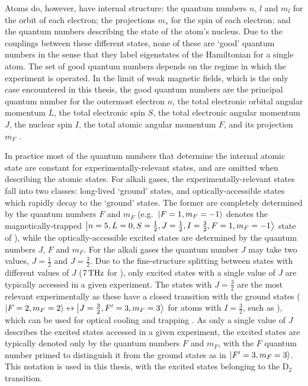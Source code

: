 Atoms do, however, have internal structure: the quantum numbers $n$, $l$ and $m_l$ for the orbit of each electron; the projections $m_s$ for the spin of each electron; and the quantum numbers describing the state of the atom's nucleus.  Due to the couplings between these different states, none of these are `good' quantum numbers in the sense that they label eigenstates of the Hamiltonian for a single atom.  The set of good quantum numbers depends on the regime in which the experiment is operated.  In the limit of weak magnetic fields, which is the only case encountered in this thesis, the good quantum numbers are the principal quantum number for the outermost electron $n$, the total electronic orbital angular momentum $L$, the total electronic spin $S$, the total electronic angular momentum $J$, the nuclear spin $I$, the total atomic angular momentum $F$, and its projection $m_F$ \citep{Bergmann:1997}.  

In practice most of the quantum numbers that determine the internal atomic state are constant for experimentally-relevant states, and are omitted when describing the atomic states.  For alkali gases, the experimentally-relevant states fall into two classes: long-lived `ground' states, and optically-accessible states which rapidly decay to the `ground' states.  The former are completely determined by the quantum numbers $F$ and $m_F$ (e.g.\ ${\left|F=1, m_F=-1\right>}$ denotes the magnetically-trapped ${\left|n=5, L=0, S=\frac{1}{2}, J = \frac{1}{2}, I=\frac{3}{2}, F=1, m_F=-1\right>}$ state of ), while the optically-accessible excited states are determined by the quantum numbers $J$, $F$ and $m_F$.  For the alkali gases the quantum number $J$ may take two values, $J = \frac{1}{2}$ and $J = \frac{3}{2}$.  Due to the fine-structure splitting between states with different values of $J$ ($\unit[7]{THz}$ for ), only excited states with a single value of $J$ are typically accessed in a given experiment.  The states with $J=\frac{3}{2}$ are the most relevant experimentally as these have a closed transition with the ground states (${\left|F=2, m_F=2\right>} \leftrightarrow {\ensuremath{\left|J=\frac{3}{2}, F'=3, m_F=3\right>}}$ for atoms with $I=\frac{3}{2}$, such as ), which can be used for optical cooling and trapping \citep{Metcalf:1999}.  As only a single value of $J$ describes the excited states accessed in a given experiment, the excited states are typically denoted only by the quantum numbers $F$ and $m_F$, with the $F$ quantum number primed to distinguish it from the ground states as in ${\left|F'=3, m_F=3\right>}$.  This notation is used in this thesis, with the excited states belonging to the $\text{D}_2$ transition.

